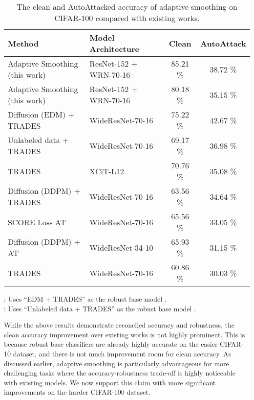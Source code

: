 \documentclass[11pt, letterpaper]{article}
\theoremstyle{plain}
\theoremstyle{definition}
\begin{document}
\begin{table}
	\centering
	\caption{The clean and AutoAttacked accuracy of adaptive smoothing on CIFAR-100 compared with existing works.}
	\label{tab:compare_cifar100}
	\vspace{-1mm}

	\begin{small}
	\begin{tabular}{l|l!{\vrule width 2pt}c|c}
		\toprule
		Method & Model Architecture & Clean & AutoAttack \\
		\midrule
		Adaptive Smoothing (this work) 			& ResNet-152 + WRN-70-16		& 85.21 \% & 38.72 \% \\
		Adaptive Smoothing (this work) 	& ResNet-152 + WRN-70-16		& 80.18 \% & 35.15 \% \\
		\midrule
		Diffusion (EDM) + TRADES \citep{Wang23}			& WideResNet-70-16			& 75.22 \% & 42.67 \% \\
		Unlabeled data + TRADES \citep{Gowal20}			& WideResNet-70-16			& 69.17 \% & 36.98 \% \\
		TRADES \citep{Debenedetti22}				& XCiT-L12 \citep{Ali21}		& 70.76 \% & 35.08 \% \\
		Diffusion (DDPM) + TRADES \citep{Rebuffi21}		& WideResNet-70-16			& 63.56 \% & 34.64 \% \\
		SCORE Loss AT \citep{Pang22}						& WideResNet-70-16			& 65.56 \% & 33.05 \% \\
		Diffusion (DDPM) + AT \citep{Sehwag22}			& WideResNet-34-10			& 65.93 \% & 31.15 \% \\
		TRADES \citep{Gowal20}							& WideResNet-70-16			& 60.86 \% & 30.03 \% \\
		\bottomrule
	\end{tabular}
	\end{small}
	\vspace{3mm}

	\small{: Uses ``EDM + TRADES'' \citep{Wang23} as the robust base model . } \\
	\small{: Uses ``Unlabeled data + TRADES'' \citep{Gowal20} as the robust base model . }
\end{table}

While the above results demonstrate reconciled accuracy and robustness, the clean accuracy improvement over existing works is not highly prominent. This is because robust base classifiers are already highly accurate on the easier CIFAR-10 dataset, and there is not much improvement room for clean accuracy. As discussed earlier, adaptive smoothing is particularly advantageous for more challenging tasks where the accuracy-robustness trade-off is highly noticeable with existing models. We now support this claim with more significant improvements on the harder CIFAR-100 dataset.
\end{document}
